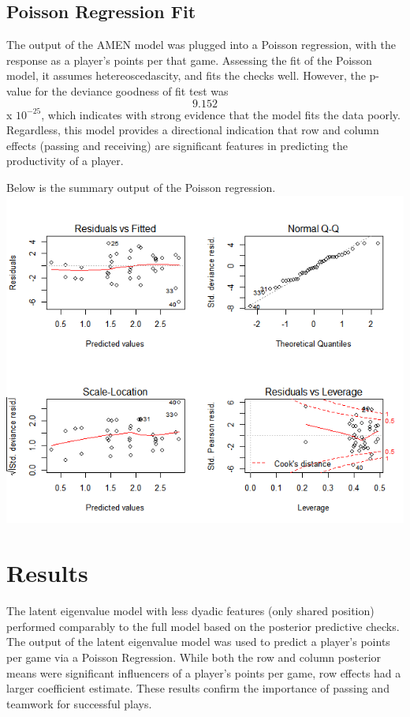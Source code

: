 \documentclass[12pt,twoside]{dukestatscithesis}
\theoremstyle{definition}
\theoremstyle{definition}
\theoremstyle{definition}
\theoremstyle{remark}
\begin{document}
\subsection{Poisson Regression Fit}\label{poisson-regression-fit}

The output of the AMEN model was plugged into a Poisson regression, with
the response as a player's points per that game. Assessing the fit of
the Poisson model, it assumes hetereoscedascity, and fits the checks
well. However, the p-value for the deviance goodness of fit test was
\[9.152\] x \(10^{-25}\), which indicates with strong evidence that the
model fits the data poorly. Regardless, this model provides a
directional indication that row and column effects (passing and
receiving) are significant features in predicting the productivity of a
player.

Below is the summary output of the Poisson regression.
\includegraphics{img/poissonsummary2.png}

\section{Results}\label{results-1}

The latent eigenvalue model with less dyadic features (only shared
position) performed comparably to the full model based on the posterior
predictive checks. The output of the latent eigenvalue model was used to
predict a player's points per game via a Poisson Regression. While both
the row and column posterior means were significant influencers of a
player's points per game, row effects had a larger coefficient estimate.
These results confirm the importance of passing and teamwork for
successful plays.
\end{document}
